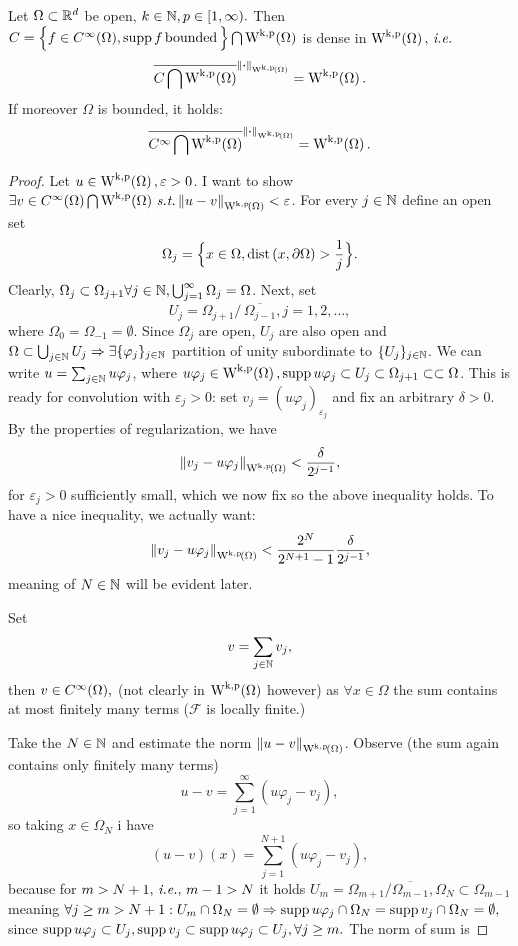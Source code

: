 \documentclass{article}
\begin{document}
\begin{theorem}
	Let $\Omega \subset {\mathbb R}^d$ be open, $k \in {\mathbb N}, p \in [1,\infty).$ Then $C = \Big\{ f \in C^\infty(\Omega), \supp f \, \text{bounded} \,\Big\} \bigcap \WkpSet{\Omega}$ is dense in $\WkpSet{\Omega}, \, \text{\textit{i.e.}} \,$
	\[
		\overline{C \bigcap \WkpSet{\Omega}}^{\norm{\vdot}_{\WkpSet{\Omega}}} = \WkpSet{\Omega}.
	\]
	If moreover $\Omega$ is bounded, it holds:
	\[
		\overline{C^{\infty}\bigcap \WkpSet{\Omega}}^{\norm{\vdot}_{\WkpSet{\Omega}}} = \WkpSet{\Omega}.
	\]
\end{theorem}
\begin{proof}
	Let $u \in \WkpSet{\Omega}, \varepsilon >0$. I want to show $\exists v \in C^\infty(\Omega) \bigcap \WkpSet{\Omega} \, \text{\textit{s.t.}} \, \norm{u-v}_{\WkpSet{\Omega}} < \varepsilon$.
For every $j \in {\mathbb N}$ define an open set
	\[
		\Omega_j = \Big\{ x \in \Omega, \operatorname{dist}\qty(x,\partial \Omega) > \frac{1}{j}\Big\}.
	\]
	Clearly, $\Omega_j \subset \Omega_{j+1} \forall j \in {\mathbb N}, \bigcup_{j=1}^\infty \Omega_j =\Omega$. Next, set
	\[
		U_j = \Omega_{j+1} /\,  \overline{\Omega_{j-1}}, j=1,2, \dots,
	\]
	where $\Omega_0 = \Omega_{-1} = \emptyset$. Since $\Omega_j$ are open, $U_j$ are also open and $\Omega \subset \bigcup_{j \in {\mathbb N}}U_j  \Rightarrow \exists \{\varphi_j\}_{j\in {\mathbb N}} $ partition of unity subordinate to $\{U_j\}_{j \in {\mathbb N}}$. We can write $u = \sum_{j \in {\mathbb N}} u \varphi_j$, where $u \varphi_j \in \WkpSet{\Omega}, \supp u \varphi_j \subset U_j \subset \Omega_{j+1} \subset \subset \Omega$. This is ready for convolution with $\varepsilon_j >0$: set $ v_j = (u \varphi_j)_{\varepsilon_j}$ and fix an arbitrary $\delta>0.$ By the properties of regularization, we have
	\[
		\norm{v_j - u \varphi_j }_{\WkpSet{\Omega}} < \frac{\delta}{2^{j-1}},
	\]
	for $\varepsilon_j > 0$ sufficiently small, which we now fix so the above inequality holds. To have a nice inequality, we actually want:
	\[
		\norm{v_j - u \varphi_j}_{\WkpSet{\Omega}} < \frac{2^N}{2^{N+1}-1} \frac{\delta}{2^{j-1}},
	\]
	meaning of $N \in {\mathbb N}$ will be evident later. 


	Set
	\[
		v = \sum_{j\in {\mathbb N}} v_j,
	\]
	then $v \in C^{\infty}\qty(\Omega),$ (not clearly in $\WkpSet{\Omega}$ however) as $\forall x \in \Omega$ the sum contains at most finitely many terms ($ \mathcal{F}$ is locally finite.)


	Take the $N \in {\mathbb N}$ and estimate the norm $\norm{u-v}_{\WkpSet{\Omega}}$. Observe (the sum again contains only finitely many terms)
	\[
		u-v = \sum_{j=1}^\infty(u \varphi_j - v_j),
	\]
	so taking $x \in \Omega_N$ i have
	\[
		(u-v)(x) = \sum_{j=1}^{N+1}(u \varphi_j - v_j),
	\]
		because for $m > N+1, \, \text{\textit{i.e.}}, \, m-1 >N$ it holds $U_m = \Omega_{m+1}/ \overline{\Omega_{m-1}}, \Omega_N \subset \Omega_{m-1}$ meaning $\forall j \geq m > N+1: U_m \cap \Omega_N = \emptyset \Rightarrow \operatorname{supp} u \varphi_j \cap \Omega_N = \operatorname{supp} v_j \cap \Omega_N = \emptyset,$ since $\operatorname{supp} u \varphi_j \subset U_j, \operatorname{supp} v_j \subset \operatorname{supp} u \varphi_j \subset U_j, \forall j \geq m.$ 
	The norm of sum is


\end{proof}
\end{document}
